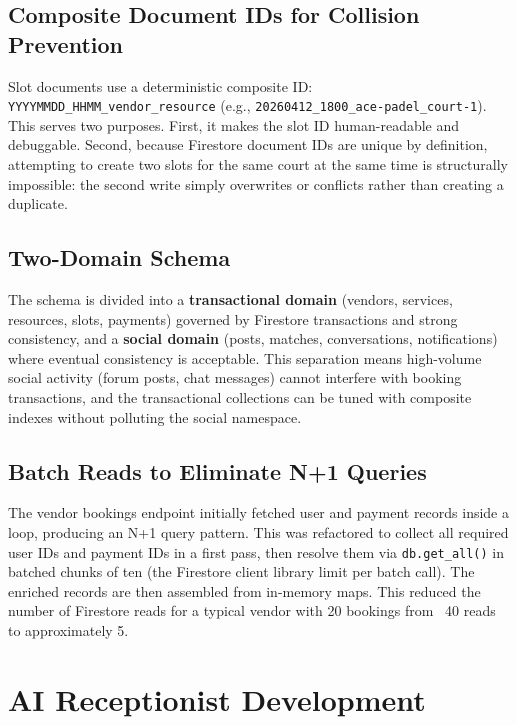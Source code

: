 \subsection{Composite Document IDs for Collision Prevention}

Slot documents use a deterministic composite ID: \texttt{YYYYMMDD\_HHMM\_{vendor}\_{resource}} (e.g., \texttt{20260412\_1800\_ace-padel\_court-1}). This serves two purposes. First, it makes the slot ID human-readable and debuggable. Second, because Firestore document IDs are unique by definition, attempting to create two slots for the same court at the same time is structurally impossible: the second write simply overwrites or conflicts rather than creating a duplicate.

\subsection{Two-Domain Schema}

The schema is divided into a \textbf{transactional domain} (vendors, services, resources, slots, payments) governed by Firestore transactions and strong consistency, and a \textbf{social domain} (posts, matches, conversations, notifications) where eventual consistency is acceptable. This separation means high-volume social activity (forum posts, chat messages) cannot interfere with booking transactions, and the transactional collections can be tuned with composite indexes without polluting the social namespace.

\subsection{Batch Reads to Eliminate N+1 Queries}

The vendor bookings endpoint initially fetched user and payment records inside a loop, producing an N+1 query pattern. This was refactored to collect all required user IDs and payment IDs in a first pass, then resolve them via \texttt{db.get\_all()} in batched chunks of ten (the Firestore client library limit per batch call). The enriched records are then assembled from in-memory maps. This reduced the number of Firestore reads for a typical vendor with 20 bookings from ~40 reads to approximately 5.

\section{AI Receptionist Development}
\label{sec:dev-agent}

